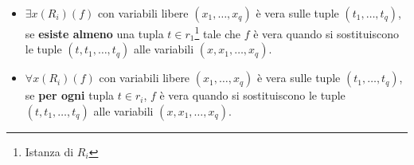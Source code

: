 \documentclass{report}
\begin{document}
\begin{itemize}
\item $\exists x(R_i)(f)$ con variabili libere $(x_1, \dots, x_q)$ \`e vera sulle tuple $(t_1, \dots, t_q)$, se \textbf{esiste almeno} una tupla $t\in r_1$\footnote{Istanza di $R_i$} tale che $f$ \`e vera quando si sostituiscono le tuple $(t, t_1, \dots, t_q)$ alle variabili $(x, x_1, \dots, x_q)$.
\item $\forall x(R_i)(f)$ con variabili libere $(x_1, \dots, x_q)$ \`e vera sulle tuple $(t_1, \dots, t_q)$, se \textbf{per ogni} tupla $t\in r_i$, $f$ \`e vera quando si sostituiscono le tuple $(t, t_1, \dots, t_q)$ alle variabili $(x, x_1, \dots, x_q)$.
\end{itemize}
\end{document}
